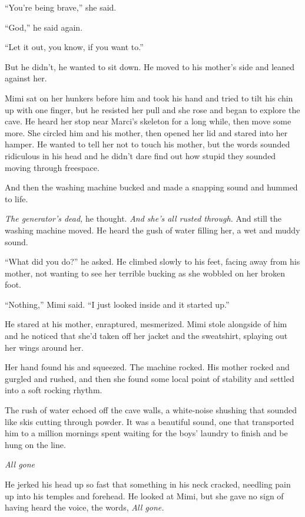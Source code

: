 \documentclass{article}
\begin{document}
``You're being brave,'' she said.

``God,'' he said again.

``Let it out, you know, if you want to.''

But he didn't, he wanted to sit down.  He moved to his mother's side
and leaned against her.

Mimi sat on her hunkers before him and took his hand and tried to tilt
his chin up with one finger, but he resisted her pull and she rose and
began to explore the cave.  He heard her stop near Marci's skeleton
for a long while, then move some more.  She circled him and his
mother, then opened her lid and stared into her hamper.  He wanted to
tell her not to touch his mother, but the words sounded ridiculous in
his head and he didn't dare find out how stupid they sounded moving
through freespace.

And then the washing machine bucked and made a snapping sound and
hummed to life.

\textit{The generator's dead,} he thought.  \textit{And she's all
rusted through.} And still the washing machine moved.  He heard the
gush of water filling her, a wet and muddy sound.

``What did you do?'' he asked.  He climbed slowly to his feet, facing
away from his mother, not wanting to see her terrible bucking as she
wobbled on her broken foot.

``Nothing,'' Mimi said.  ``I just looked inside and it started up.''

He stared at his mother, enraptured, mesmerized.  Mimi stole alongside
of him and he noticed that she'd taken off her jacket and the
sweatshirt, splaying out her wings around her.

Her hand found his and squeezed.  The machine rocked.  His mother
rocked and gurgled and rushed, and then she found some local point of
stability and settled into a soft rocking rhythm.

The rush of water echoed off the cave walls, a white-noise shushing
that sounded like skis cutting through powder.  It was a beautiful
sound, one that transported him to a million mornings spent waiting
for the boys' laundry to finish and be hung on the line.

\textit{All gone}

He jerked his head up so fast that something in his neck cracked,
needling pain up into his temples and forehead.  He looked at Mimi,
but she gave no sign of having heard the voice, the words, \textit{All
gone.}
\end{document}
